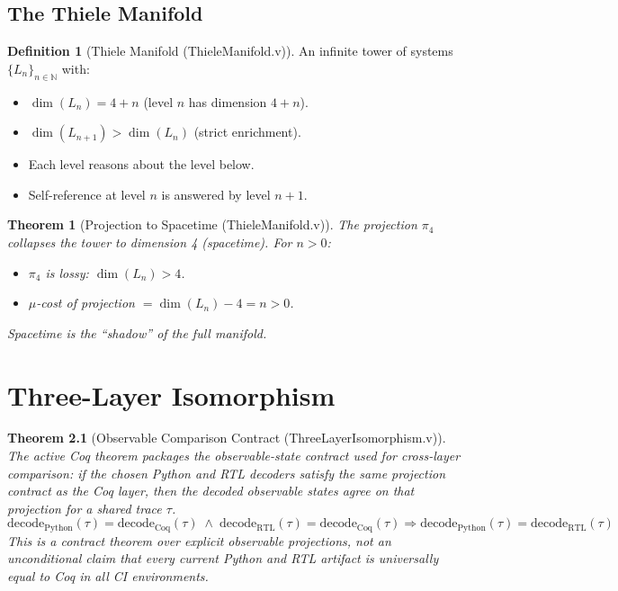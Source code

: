 \documentclass[11pt, a4paper]{report}
\theoremstyle{definition}
\newtheorem{definition}{Definition}[chapter]
\theoremstyle{plain}
\newtheorem{theorem}{Theorem}[chapter]
\newcommand{\N}{\mathbb{N}}
\begin{document}
\section{The Thiele Manifold}

\begin{definition}[Thiele Manifold {\normalfont (ThieleManifold.v)}]
An infinite tower of systems $\{L_n\}_{n \in \N}$ with:
\begin{itemize}
    \item $\dim(L_n) = 4 + n$ (level $n$ has dimension $4+n$).
    \item $\dim(L_{n+1}) > \dim(L_n)$ (strict enrichment).
    \item Each level reasons about the level below.
    \item Self-reference at level $n$ is answered by level $n+1$.
\end{itemize}
\end{definition}

\begin{theorem}[Projection to Spacetime {\normalfont (ThieleManifold.v)}]
The projection $\pi_4$ collapses the tower to dimension 4 (spacetime). For $n > 0$:
\begin{itemize}
    \item $\pi_4$ is lossy: $\dim(L_n) > 4$.
    \item $\mu$-cost of projection $= \dim(L_n) - 4 = n > 0$.
\end{itemize}
Spacetime is the ``shadow'' of the full manifold.
\end{theorem}
\chapter{Three-Layer Isomorphism}

\begin{theorem}[Observable Comparison Contract {\normalfont (ThreeLayerIsomorphism.v)}]
The active Coq theorem packages the \emph{observable-state contract} used for
cross-layer comparison: if the chosen Python and RTL decoders satisfy the same
projection contract as the Coq layer, then the decoded observable states agree
on that projection for a shared trace $\tau$.
\[
\mathrm{decode}_{\mathrm{Python}}(\tau) = \mathrm{decode}_{\mathrm{Coq}}(\tau)
\;\wedge\;
\mathrm{decode}_{\mathrm{RTL}}(\tau) = \mathrm{decode}_{\mathrm{Coq}}(\tau)
\Longrightarrow
\mathrm{decode}_{\mathrm{Python}}(\tau) = \mathrm{decode}_{\mathrm{RTL}}(\tau)
\]
This is a contract theorem over explicit observable projections, not an
unconditional claim that every current Python and RTL artifact is universally
equal to Coq in all CI environments.
\end{theorem}
\end{document}
